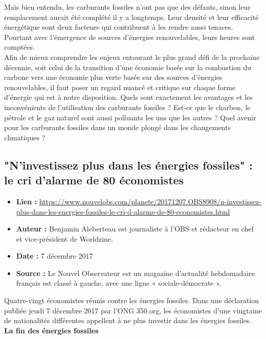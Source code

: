 \documentclass[8pt]{article}
\begin{document}
Mais bien entendu, les carburants fossiles n’ont pas que des défauts, sinon leur remplacement aurait été complété il y a longtemps. Leur densité et leur efficacité énergétique sont deux facteurs qui contribuent à les rendre aussi tenaces. Pourtant avec l’émergence de sources d’énergies renouvelables, leurs heures sont comptées.\\

Afin de mieux comprendre les enjeux entourant le plus grand défi de la prochaine décennie, soit celui de la transition d’une économie basée sur la combustion du carbone vers une économie plus verte basée sur des sources d’énergies renouvelables, il faut poser un regard nuancé et critique sur chaque forme d’énergie qui est à notre disposition. Quels sont exactement les avantages et les inconvénients de l’utilisation des carburants fossiles ? Est-ce que le charbon, le pétrole et le gaz naturel sont aussi polluants les uns que les autres ? Quel avenir pour les carburants fossiles dans un monde plongé dans les changements climatiques ?

\newpage

\subsection{"N'investissez plus dans les énergies fossiles" : le cri d'alarme de 80 économistes}
\begin{itemize}
	\item \textbf{Lien : }  \url{https://www.nouvelobs.com/planete/20171207.OBS8908/n-investissez-plus-dans-les-energies-fossiles-le-cri-d-alarme-de-80-economistes.html} 
	\item \textbf{Auteur : } Benjamin Aleberteau est journaliste à l'OBS et rédacteur en chef et vice-président de Worldzine.
	\item \textbf{Date : }  7 décembre 2017 
	\item \textbf{Source : }  Le Nouvel Observateur est un magazine d'actualité hebdomadaire français est classé à gauche, avec une ligne « sociale-démocrate ».
\end{itemize}


Quatre-vingt économistes réunis contre les énergies fossiles. Dans une déclaration publiée jeudi 7 décembre 2017 par l’ONG 350.org, les économistes d’une vingtaine de nationalités différentes appellent à ne plus investir dans les énergies fossiles. \\

\textbf{La fin des énergies fossiles}\\
\end{document}
